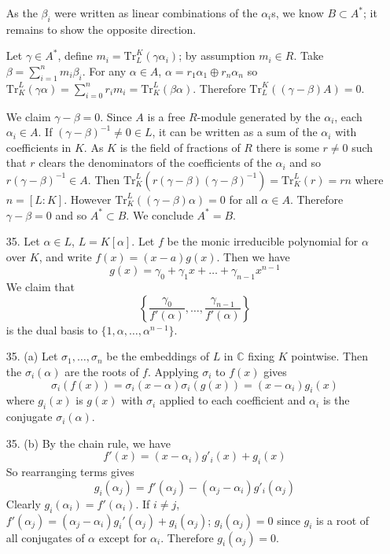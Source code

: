 \documentclass{article}
\begin{document}
\begin{enumerate}
As the $\beta_i$ were written as linear combinations of the $\alpha_i$s, we know $B \subset A^{*}$; it remains to show the opposite direction.

Let $\gamma \in A^{*}$, define $m_i = \text{Tr}^{K}_{L}(\gamma\alpha_i)$; by assumption $m_i \in R$.  Take $\beta = \sum_{i=1}^{n} m_i \beta_i$.  For any $\alpha \in A$, $\alpha = r_1 \alpha_1 \oplus r_n \alpha_n$ so $\text{Tr}^{L}_{K}(\gamma\alpha) = \sum_{i = 0}^{n} r_i m_i = \text{Tr}^{L}_{K}(\beta\alpha)$.  Therefore $\text{Tr}^{K}_{L}((\gamma - \beta)A) = 0$.

We claim $\gamma - \beta = 0$.  Since $A$ is a free $R$-module generated by the $\alpha_i$, each $\alpha_i \in A$.  If $(\gamma - \beta)^{-1} \neq 0 \in L$, it can be written as a sum of the $\alpha_i$ with coefficients in $K$.  As $K$ is the field of fractions of $R$ there is some $r \neq 0$ such that $r$ clears the denominators of the coefficients of the $\alpha_i$ and so $r(\gamma - \beta)^{-1} \in A$.  Then $\text{Tr}^{L}_{K}(r(\gamma - \beta)(\gamma - \beta)^{-1}) = \text{Tr}^{L}_{K}(r) = rn$ where $n = [L : K]$.  However $\text{Tr}^{L}_{K}((\gamma - \beta)\alpha) = 0$ for all $\alpha \in A$.  Therefore $\gamma - \beta = 0$ and so $A^{*} \subset B$.  We conclude $A^{*} = B$.

\item[35.] Let $\alpha \in L$, $L = K[\alpha]$.  Let $f$ be the monic irreducible polynomial for $\alpha$ over $K$, and write $f(x) = (x - a)g(x)$.  Then we have \[ g(x) = \gamma_0 + \gamma_1 x + \ldots + \gamma_{n-1}x^{n-1} \]
We claim that \[ \left\{ \frac{\gamma_0}{f'(\alpha)}, \ldots, \frac{\gamma_{n-1}}{f'(\alpha)} \right\} \] is the dual basis to $\{ 1, \alpha, \ldots, \alpha^{n-1} \}$.

\item[35. (a)] Let $\sigma_1, \ldots, \sigma_n$ be the embeddings of $L$ in $\mathbb{C}$ fixing $K$ pointwise.  Then the $\sigma_i(\alpha)$ are the roots of $f$.  Applying $\sigma_i$ to $f(x)$ gives \[\sigma_i(f(x)) = \sigma_i(x - \alpha)\sigma_i(g(x)) = (x - \alpha_i)g_{i}(x)\] where $g_i(x)$ is $g(x)$ with $\sigma_i$ applied to each coefficient and $\alpha_i$ is the conjugate $\sigma_i(\alpha)$.
\item[35. (b)] By the chain rule, we have
\[ f'(x) = (x - \alpha_i)g'_i(x) + g_i(x) \]
So rearranging terms gives \[g_i(\alpha_j) = f'(\alpha_j) - (\alpha_j - \alpha_i)g'_i(\alpha_j) \] Clearly $g_i(\alpha_i) = f'(\alpha_i)$.  If $i \neq j$, $f'(\alpha_j) = (\alpha_j - \alpha_i)g_i'(\alpha_j) + g_i(\alpha_j)$; $g_i(\alpha_j) = 0$ since $g_i$ is a root of all conjugates of $\alpha$ except for $\alpha_i$.  Therefore $g_i(\alpha_j) = 0$.


\end{enumerate}
\end{document}
